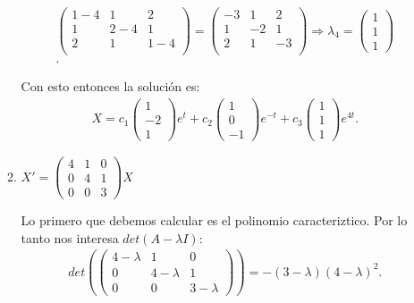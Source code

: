 \documentclass[12pt]{exam}
\begin{document}
\begin{enumerate}
\begin{enumerate}
\begin{align*}
\begin{pmatrix}
            1 - 4 & 1 & 2 \\
            1 & 2 - 4 & 1 \\
            2 & 1 & 1 - 4\\
        \end{pmatrix} =  \begin{pmatrix} 
            -3 & 1 & 2 \\
            1 & -2 & 1 \\
            2 & 1 & -3 \\
        \end{pmatrix} \Rightarrow \lambda_4 = \begin{pmatrix} 1 \\ 1 \\ 1 \end{pmatrix} \\
    .\end{align*}

    Con esto entonces la solución es:
    \begin{align*}
        X = c_1 \begin{pmatrix} 1 \\ -2 \\1 \end{pmatrix} e^t + c_2 \begin{pmatrix} 1 \\ 0 \\ -1 \end{pmatrix} e^{-t} +  c_3 \begin{pmatrix} 1 \\ 1 \\ 1 \end{pmatrix} e^{4t}
    .\end{align*}
      \item $X' = \begin{pmatrix} 
	  4 & 1 & 0 \\
	  0 & 4 & 1 \\
	  0 & 0 & 3
	\end{pmatrix} X$

    Lo primero que debemos calcular es el polinomio caracteriztico. Por lo tanto nos interesa
    $det\left( A - \lambda I \right) $:
    \begin{align*}
        det\left( \begin{pmatrix} 
                4 - \lambda & 1 & 0 \\
                0 & 4 - \lambda & 1 \\
                0 & 0 & 3 - \lambda 
        \end{pmatrix}  \right) = - \left( 3-\lambda \right) \left( 4-\lambda \right)^2
    .\end{align*}


\end{enumerate}
\end{enumerate}
\end{document}
